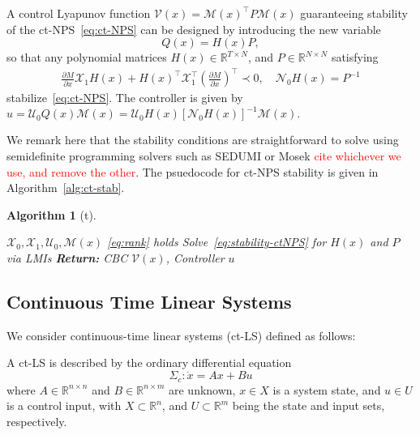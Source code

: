 \documentclass[sigconf]{acmart}
\newtheorem{algorithm}{Algorithm}
\newcommand{\BW}{\textcolor{red}}
\begin{document}
\begin{theorem}
\label{thm:ctNPS-stable}
A control Lyapunov function $\mathcal{V}(x)=\mathcal{M}(x)^\top P\mathcal{M}(x)$ guaranteeing stability of the ct-NPS~\eqref{eq:ct-NPS} can be designed by introducing the new variable
\begin{equation*}
\label{eq:Q=HP-ctNPS}
Q(x)=H(x)P,
\end{equation*}
so that any polynomial matrices $H(x)\in\mathbb{R}^{T\times N}$, and $P\in\mathbb{R}^{N\times N}$ satisfying
\begin{align}
\label{eq:stability-ctNPS}
\frac{\partial M}{\partial x}\mathcal{X}_{1}H(x) + H(x)^\top\mathcal{X}_{1}^\top(\frac{\partial M}{\partial x})^\top \prec 0, \quad \mathcal{N}_{0}H(x)=P^{-1}
\end{align}
stabilize~\eqref{eq:ct-NPS}.
The controller is given by~\newline$u=\mathcal{U}_{0}Q(x)\mathcal{M}(x) = \mathcal{U}_{0}H(x)[\mathcal{N}_{0}H(x)]^{-1}\mathcal{M}(x).$
\end{theorem}

We remark here that the stability conditions are straightforward to solve using semidefinite programming solvers such as SEDUMI or Mosek \BW{cite whichever we use, and remove the other}. The psuedocode for ct-NPS stability is given in Algorithm~\ref{alg:ct-stab}.

\begin{algorithm}[t]
\caption{Hierarchy for ct-NPS Stability}\label{alg:ct-stab}
\begin{algorithmic}[1]
\Require $\mathcal{X}_0,\mathcal{X}_1,\mathcal{U}_0, \mathcal{M}(x)$
\Ensure \eqref{eq:rank} holds
\State Solve~\eqref{eq:stability-ctNPS} for $H(x)$ and $P$ via LMIs
\noindent\Statex\textbf{Return:} CBC $\mathcal{V}(x)$, Controller $u$
\end{algorithmic}
\end{algorithm}

\subsection{Continuous Time Linear Systems}\label{subsec:continuous-time-linear-systems}

We consider continuous-time linear systems (ct-LS) defined as follows:

\begin{definition}
\label{def:system-description-ct-LS}
A ct-LS is described by the ordinary differential equation
\begin{equation}
\label{eq:ct-LS}
\Sigma_c: \dot{x} = Ax+Bu
\end{equation}
where $A\in\mathbb{R}^{n\times n}$ and $B\in\mathbb{R}^{n\times m}$ are unknown, $x\in X$ is a system state, and $u\in U$ is a control input, with $X\subset\mathbb{R}^n$, and $U\subset\mathbb{R}^m$ being the state and input sets, respectively.
\end{definition}
\end{document}
